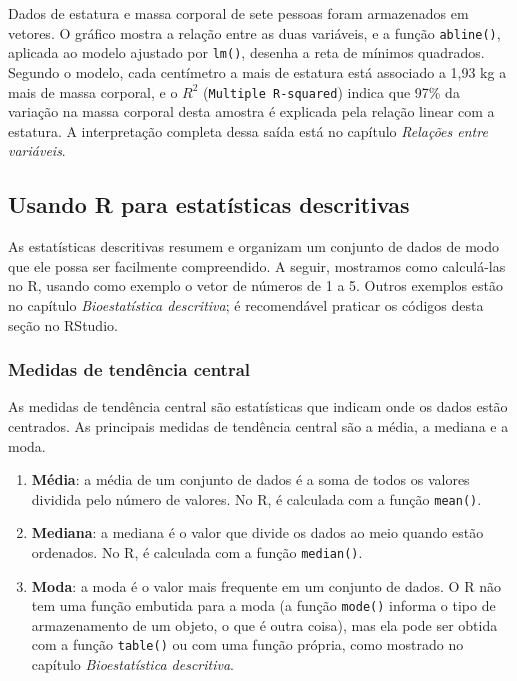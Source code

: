 \documentclass[
]{book}
\begin{document}
Dados de estatura e massa corporal de sete pessoas foram armazenados em vetores. O gráfico mostra a relação entre as duas variáveis, e a função \texttt{abline()}, aplicada ao modelo ajustado por \texttt{lm()}, desenha a reta de mínimos quadrados. Segundo o modelo, cada centímetro a mais de estatura está associado a 1,93 kg a mais de massa corporal, e o \(R^2\) (\texttt{Multiple\ R-squared}) indica que 97\% da variação na massa corporal desta amostra é explicada pela relação linear com a estatura. A interpretação completa dessa saída está no capítulo \emph{Relações entre variáveis}.

\subsection{Usando R para estatísticas descritivas}\label{usando-r-para-estatuxedsticas-descritivas}

As estatísticas descritivas resumem e organizam um conjunto de dados de modo que ele possa ser facilmente compreendido. A seguir, mostramos como calculá-las no R, usando como exemplo o vetor de números de 1 a 5. Outros exemplos estão no capítulo \emph{Bioestatística descritiva}; é recomendável praticar os códigos desta seção no RStudio.

\subsubsection{Medidas de tendência central}\label{medidas-de-tenduxeancia-central-1}

As medidas de tendência central são estatísticas que indicam onde os dados estão centrados. As principais medidas de tendência central são a média, a mediana e a moda.

\begin{enumerate}
\def\labelenumi{\arabic{enumi}.}
\item
  \textbf{Média}: a média de um conjunto de dados é a soma de todos os valores dividida pelo número de valores. No R, é calculada com a função \texttt{mean()}.
\item
  \textbf{Mediana}: a mediana é o valor que divide os dados ao meio quando estão ordenados. No R, é calculada com a função \texttt{median()}.
\item
  \textbf{Moda}: a moda é o valor mais frequente em um conjunto de dados. O R não tem uma função embutida para a moda (a função \texttt{mode()} informa o tipo de armazenamento de um objeto, o que é outra coisa), mas ela pode ser obtida com a função \texttt{table()} ou com uma função própria, como mostrado no capítulo \emph{Bioestatística descritiva}.
\end{enumerate}
\end{document}

